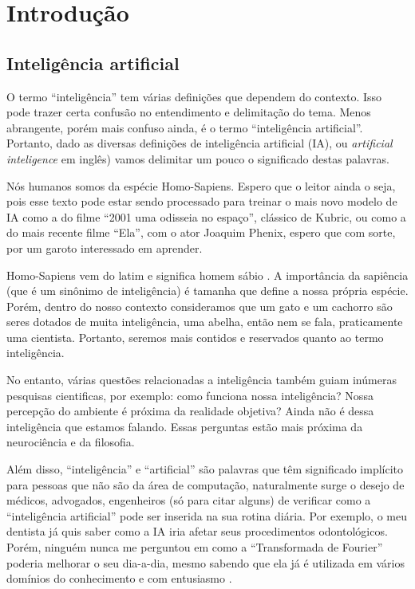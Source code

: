 \documentclass[a4paper,12pt]{book}
\begin{document}

\tableofcontents

\chapter{Introdução}

	\section{Inteligência artificial}
		
	O termo ``inteligência'' tem várias definições que dependem do contexto. Isso pode trazer certa confusão no entendimento e delimitação do tema. Menos abrangente, porém mais confuso ainda, é o termo ``inteligência artificial''. Portanto, dado as diversas definições de inteligência artificial (IA), ou \textit{artificial inteligence} em inglês) vamos delimitar um pouco o significado destas palavras.
	
	Nós humanos somos da espécie Homo-Sapiens. Espero que o leitor ainda o seja, pois esse texto pode estar sendo processado para treinar o mais novo modelo de IA como a do filme ``2001 uma odisseia no espaço'', clássico de Kubric, ou como a do mais recente filme ``Ela'', com o ator Joaquim Phenix, espero que com sorte, por um garoto interessado em aprender. 
	
	Homo-Sapiens vem do latim e significa homem sábio \cite{wikipediahumano}. A importância da sapiência (que é um sinônimo de inteligência) é tamanha que define a nossa própria espécie. Porém, dentro do nosso contexto consideramos que um gato e um cachorro são seres dotados de muita inteligência, uma abelha, então nem se fala, praticamente uma cientista. Portanto, seremos mais contidos e reservados quanto ao termo inteligência.
	
	No entanto, várias questões relacionadas a inteligência também guiam inúmeras pesquisas cientificas, por exemplo: como funciona nossa inteligência? Nossa percepção do ambiente é próxima da realidade objetiva? Ainda não é dessa inteligência que estamos falando. Essas perguntas estão mais próxima da neurociência e da filosofia.
	
	Além disso, ``inteligência'' e ``artificial'' são palavras que têm significado implícito para pessoas que não são da área de computação, naturalmente surge o desejo de médicos, advogados, engenheiros (só para citar alguns) de verificar como a “inteligência artificial” pode ser inserida na sua rotina diária. Por exemplo, o meu dentista já quis saber como a IA iria afetar seus procedimentos odontológicos. Porém, ninguém nunca me perguntou em como a ``Transformada de Fourier'' poderia melhorar o seu dia-a-dia, mesmo sabendo que ela já é utilizada em vários domínios do conhecimento e com entusiasmo \cite{wikipediafourier}.
	
\end{document}
